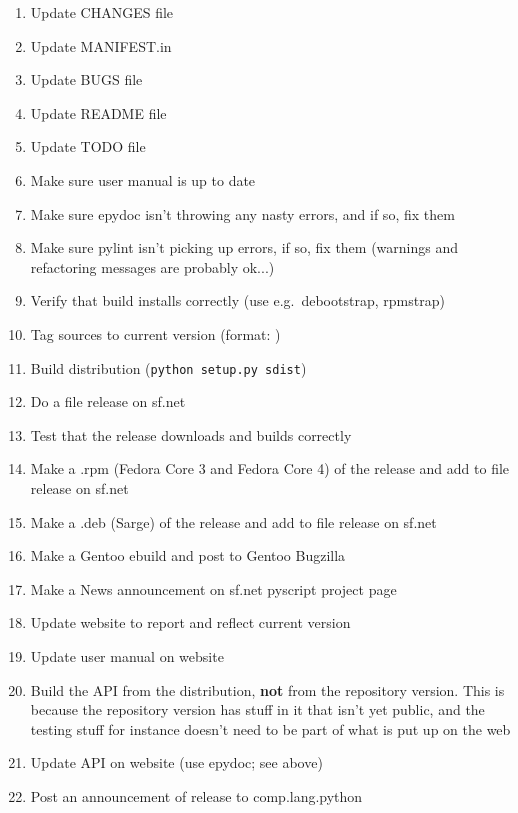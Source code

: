 \documentclass[12pt,a4paper]{article}
\begin{document}
\begin{enumerate}
\item Update CHANGES file
\item Update MANIFEST.in
\item Update BUGS file
\item Update README file
\item Update TODO file
\item Make sure user manual is up to date
\item Make sure epydoc isn't throwing any nasty errors, and if so, fix them
\item Make sure pylint isn't picking up errors, if so, fix them (warnings
and refactoring messages are probably ok...)
\item Verify that build installs correctly (use e.g.~debootstrap, rpmstrap)
\item Tag sources to current version (format: )
\item Build distribution (\texttt{python setup.py sdist})
\item Do a file release on sf.net
\item Test that the release downloads and builds correctly
\item Make a .rpm (Fedora Core 3 and Fedora Core 4) of the release and 
add to file release on sf.net
\item Make a .deb (Sarge) of the release and add to file release on sf.net
\item Make a Gentoo ebuild and post to Gentoo Bugzilla
\item Make a News announcement on sf.net pyscript project page
\item Update website to report and reflect current version
\item Update user manual on website
\item Build the API from the distribution, \textbf{not} from the repository 
version.  This is because the repository version has stuff in it that isn't
yet public, and the testing stuff for instance doesn't need to be part of
what is put up on the web
\item Update API on website (use epydoc; see above)
\item Post an announcement of release to comp.lang.python
\end{enumerate}
\end{document}
